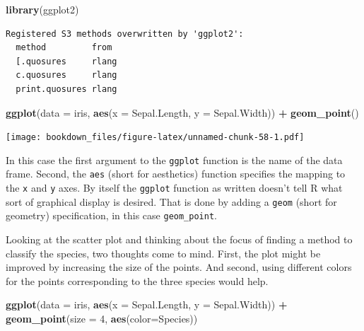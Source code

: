 \documentclass[]{krantz}
\makeatletter
\newenvironment{Shaded}{\begin{snugshade}}{\end{snugshade}}
\newcommand{\KeywordTok}[1]{\textcolor[rgb]{0.27,0.27,0.27}{\textbf{#1}}}
\newcommand{\DataTypeTok}[1]{\textcolor[rgb]{0.27,0.27,0.27}{#1}}
\newcommand{\DecValTok}[1]{\textcolor[rgb]{0.06,0.06,0.06}{#1}}
\newcommand{\StringTok}[1]{\textcolor[rgb]{0.5,0.5,0.5}{#1}}
\newcommand{\OperatorTok}[1]{\textcolor[rgb]{0.43,0.43,0.43}{\textbf{#1}}}
\newcommand{\NormalTok}[1]{#1}
\newenvironment{kframe}{%
\medskip{}
\setlength{\fboxsep}{.8em}
 \def\at@end@of@kframe{}%
 \ifinner\ifhmode%
  \def\at@end@of@kframe{\end{minipage}}%
  \begin{minipage}{\columnwidth}%
 \fi\fi%
 \def\FrameCommand##1{\hskip\@totalleftmargin \hskip-\fboxsep
 \colorbox{shadecolor}{##1}\hskip-\fboxsep
     \hskip-\linewidth \hskip-\@totalleftmargin \hskip\columnwidth}%
 \MakeFramed {\advance\hsize-\width
   \@totalleftmargin\z@ \linewidth\hsize
   \@setminipage}}%
 {\par\unskip\endMakeFramed%
 \at@end@of@kframe}
\renewenvironment{Shaded}{\begin{kframe}}{\end{kframe}}
\makeatother
\begin{document}
\begin{Shaded}
\begin{Highlighting}[]
\KeywordTok{library}\NormalTok{(ggplot2)}
\end{Highlighting}
\end{Shaded}

\begin{verbatim}
Registered S3 methods overwritten by 'ggplot2':
  method         from 
  [.quosures     rlang
  c.quosures     rlang
  print.quosures rlang
\end{verbatim}

\begin{Shaded}
\begin{Highlighting}[]
\KeywordTok{ggplot}\NormalTok{(}\DataTypeTok{data =}\NormalTok{ iris, }\KeywordTok{aes}\NormalTok{(}\DataTypeTok{x =}\NormalTok{ Sepal.Length, }\DataTypeTok{y =}\NormalTok{ Sepal.Width)) }\OperatorTok{+}\StringTok{ }
\StringTok{    }\KeywordTok{geom_point}\NormalTok{()}
\end{Highlighting}
\end{Shaded}

\texttt{[image: bookdown\_files/figure-latex/unnamed-chunk-58-1.pdf]}

In this case the first argument to the \texttt{ggplot} function is the
name of the data frame. Second, the \texttt{aes} (short for aesthetics)
function specifies the mapping to the \texttt{x} and \texttt{y} axes. By
itself the \texttt{ggplot} function as written doesn't tell R what sort
of graphical display is desired. That is done by adding a \texttt{geom}
(short for geometry) specification, in this case \texttt{geom\_point}.

Looking at the scatter plot and thinking about the focus of finding a
method to classify the species, two thoughts come to mind. First, the
plot might be improved by increasing the size of the points. And second,
using different colors for the points corresponding to the three species
would help.

\begin{Shaded}
\begin{Highlighting}[]
\KeywordTok{ggplot}\NormalTok{(}\DataTypeTok{data =}\NormalTok{ iris, }\KeywordTok{aes}\NormalTok{(}\DataTypeTok{x =}\NormalTok{ Sepal.Length, }\DataTypeTok{y =}\NormalTok{ Sepal.Width)) }\OperatorTok{+}\StringTok{ }
\StringTok{    }\KeywordTok{geom_point}\NormalTok{(}\DataTypeTok{size =} \DecValTok{4}\NormalTok{, }\KeywordTok{aes}\NormalTok{(}\DataTypeTok{color=}\NormalTok{Species))}
\end{Highlighting}
\end{Shaded}
\end{document}

